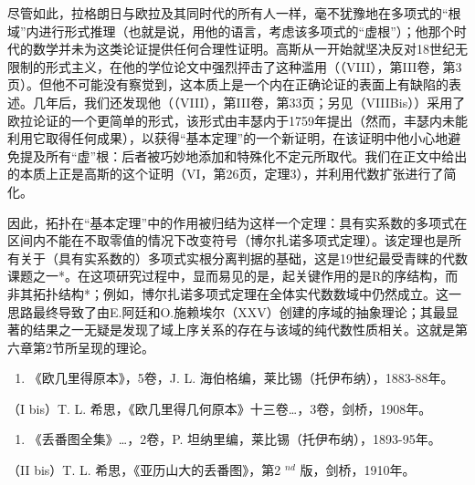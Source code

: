 尽管如此，拉格朗日与欧拉及其同时代的所有人一样，毫不犹豫地在多项式的“根域”内进行形式推理（也就是说，用他的语言，考虑该多项式的“虚根”）；他那个时代的数学并未为这类论证提供任何合理性证明。高斯从一开始就坚决反对18世纪无限制的形式主义，在他的学位论文中强烈抨击了这种滥用（（VIII），第III卷，第3页）。但他不可能没有察觉到，这本质上是一个内在正确论证的表面上有缺陷的表述。几年后，我们还发现他（（VIII），第III卷，第33页；另见（VIIIBis））采用了欧拉论证的一个更简单的形式，该形式由丰瑟内于1759年提出（然而，丰瑟内未能利用它取得任何成果），以获得“基本定理”的一个新证明，在该证明中他小心地避免提及所有“虚”根：后者被巧妙地添加和特殊化不定元所取代。我们在正文中给出的本质上正是高斯的这个证明（VI，第26页，定理3），并利用代数扩张进行了简化。

因此，拓扑在“基本定理”中的作用被归结为这样一个定理：具有实系数的多项式在区间内不能在不取零值的情况下改变符号（博尔扎诺多项式定理）。该定理也是所有关于（具有实系数的）多项式实根分离判据的基础，这是19世纪最受青睐的代数课题之一*。在这项研究过程中，显而易见的是，起关键作用的是R的序结构，而非其拓扑结构*；例如，博尔扎诺多项式定理在全体实代数数域中仍然成立。这一思路最终导致了由E.阿廷和O.施赖埃尔（XXV）创建的序域的抽象理论；其最显著的结果之一无疑是发现了域上序关系的存在与该域的纯代数性质相关。这就是第六章第2节所呈现的理论。


\begin{enumerate}
\def\labelenumi{(\Roman{enumi})}
\tightlist
\item
  《欧几里得原本》，5卷，J. L. 海伯格编，莱比锡（托伊布纳），1883-88年。
\end{enumerate}

（I bis）T. L. 希思，《欧几里得几何原本》十三卷\ldots，3卷，剑桥，1908年。

\begin{enumerate}
\def\labelenumi{(\Roman{enumi})}
\setcounter{enumi}{1}
\tightlist
\item
  《丢番图全集》\ldots，2卷，P. 坦纳里编，莱比锡（托伊布纳），1893-95年。
\end{enumerate}

（II bis）T. L. 希思，《亚历山大的丢番图》，第2 \(^{nd}\) 版，剑桥，1910年。

